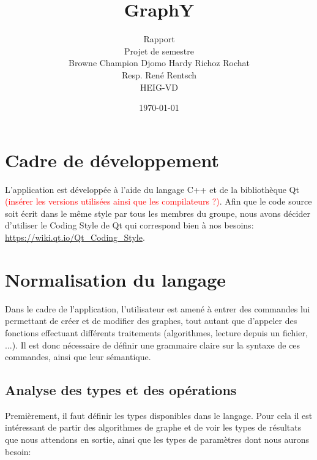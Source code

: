 \documentclass[french]{article}
\begin{document}
	
	\title{GraphY} %
	\author{Rapport\\ 
		Projet de semestre\\
		Browne Champion Djomo Hardy Richoz Rochat\\
		Resp. René Rentsch\\
		HEIG-VD}
	\date{\today} %
	\maketitle
	
	\tableofcontents
	
	\listoffigures
	
	\justify
	\normalsize
	
	\section{Cadre de développement} %
	L'application est développée à l'aide du langage C++ et de la bibliothèque Qt \textcolor{red}{(insérer les versions utilisées ainsi que les compilateurs ?)}. Afin que le code source soit écrit dans le même style par tous les membres du groupe, nous avons décider d'utiliser le Coding Style de Qt qui correspond bien à nos besoins: \url{https://wiki.qt.io/Qt_Coding_Style}.
	
	\section{Normalisation du langage} %
	Dans le cadre de l'application, l'utilisateur est amené à entrer des commandes lui permettant de créer et de modifier des graphes, tout autant que d'appeler des fonctions effectuant différents traitements (algorithmes, lecture depuis un fichier, ...). Il est donc nécessaire de définir une grammaire claire sur la syntaxe de ces commandes, ainsi que leur sémantique.
	
	\subsection{Analyse des types et des opérations} %
	Premièrement, il faut définir les types disponibles dans le langage. Pour cela il est intéressant de partir des algorithmes de graphe et de voir les types de résultats que nous attendons en sortie, ainsi que les types de paramètres dont nous aurons besoin:
	
\end{document}
